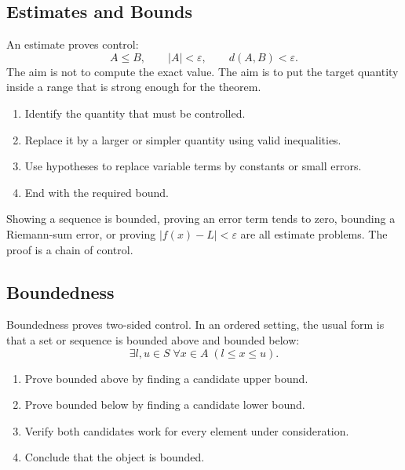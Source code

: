 \subsection*{Estimates and Bounds}
\label{subsec:property-estimates}

An estimate proves control:
\[
  A\leq B,\qquad |A|<\varepsilon,\qquad d(A,B)<\varepsilon.
\]
The aim is not to compute the exact value. The aim is to put the target
quantity inside a range that is strong enough for the theorem.

\begin{remark}
\begin{enumerate}
  \item Identify the quantity that must be controlled.
  \item Replace it by a larger or simpler quantity using valid inequalities.
  \item Use hypotheses to replace variable terms by constants or small
        errors.
  \item End with the required bound.
\end{enumerate}
\end{remark}

\begin{remark}
Showing a sequence is bounded, proving an error term tends to zero, bounding
a Riemann-sum error, or proving $|f(x)-L|<\varepsilon$ are all estimate
problems. The proof is a chain of control.
\end{remark}

\subsection*{Boundedness}
\label{subsec:property-boundedness}

Boundedness proves two-sided control. In an ordered setting, the usual form is
that a set or sequence is bounded above and bounded below:
\[
  \exists l,u\in S\;\forall x\in A\;(l\leq x\leq u).
\]

\begin{remark}
\begin{enumerate}
  \item Prove bounded above by finding a candidate upper bound.
  \item Prove bounded below by finding a candidate lower bound.
  \item Verify both candidates work for every element under consideration.
  \item Conclude that the object is bounded.
\end{enumerate}
\end{remark}

